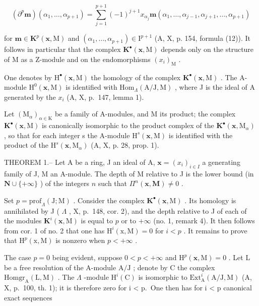 \[
\left(\partial^ {p} \boldsymbol {m}\right) \left(\alpha_ {1}, \dots , \alpha_ {p + 1}\right) = \sum_ {j = 1} ^ {p + 1} (- 1) ^ {j + 1} x _ {\alpha_ {j}} \boldsymbol {m} \left(\alpha_ {1}, \dots , \alpha_ {j - 1}, \alpha_ {j + 1}, \dots , \alpha_ {p + 1}\right)
\]

for \(\boldsymbol{m} \in \mathbf{K}^{p}(\mathbf{x}, \mathrm{M})\) and \((\alpha_{1}, \ldots, \alpha_{p+1}) \in \mathrm{I}^{p+1}\) (A, X, p. 154, formula (12)). It follows in particular that the complex \(\mathbf{K}^{\bullet}(\mathbf{x}, \mathrm{M})\) depends only on the structure of M as a Z-module and on the endomorphisms \((x_{i})_{\mathrm{M}}\) .

One denotes by \(\mathrm{H}^{\bullet}(\mathbf{x},\mathrm{M})\) the homology of the complex \(\mathbf{K}^{\bullet}(\mathbf{x},\mathrm{M})\) . The A-module \(\mathrm{H}^{0}(\mathbf{x},\mathrm{M})\) is identified with \(\mathrm{Hom}_{\Lambda}(\mathrm{A}/\mathrm{J},\mathrm{M})\) , where J is the ideal of A generated by the \(x_{i}\) (A, X, p.~147, lemma 1).

Let \((\mathrm{M}_{\alpha})_{\alpha\in\mathrm{K}}\) be a family of A-modules, and M its product; the complex \(\mathbf{K}^{\bullet}(\mathbf{x},\mathrm{M})\) is canonically isomorphic to the product complex of the \(\mathbf{K}^{\bullet}(\mathbf{x},\mathrm{M}_{\alpha})\) , so that for each integer s the A-module \(\mathrm{H}^{s}(\mathbf{x},\mathrm{M})\) is identified with the product of the \(\mathrm{H}^{s}(\mathbf{x},\mathrm{M}_{\alpha})\) (A, X, p. 28, prop. 1).

THEOREM 1.-- Let A be a ring, J an ideal of A, \(\mathbf{x} = (x_i)_{i \in I}\) a generating family of J, M an A-module. The depth of M relative to J is the lower bound (in \(\mathbf{N} \cup \{+\infty\}\) ) of the integers \(n\) such that \(\Pi^n(\mathbf{x}, \mathbf{M}) \neq 0\) .

Set \(p = \text{prof}_{\Lambda}(\text{J}; \text{M})\) . Consider the complex \(\mathbf{K}^{\bullet}(\mathbf{x}, \text{M})\) . Its homology is annihilated by J ( \(\Lambda\) , X, p.~148, cor. 2), and the depth relative to J of each of the modules \(\mathbf{K}^{i}(\mathbf{x}, \text{M})\) is equal to \(p\) or to \(+\infty\) (no. 1, remark 4). It then follows from cor. 1 of no. 2 that one has \(\text{H}^{i}(\text{x}, \text{M}) = 0\) for \(i < p\) . It remains to prove that \(\text{H}^{p}(\text{x}, \text{M})\) is nonzero when \(p < +\infty\) .

The case \(p = 0\) being evident, suppose \(0 < p < +\infty\) and \(\mathrm{H}^p(\mathbf{x},\mathrm{M}) = 0\) . Let L be a free resolution of the A-module \(\mathrm{A / J}\) ; denote by C the complex \(\mathrm{Homgr}_{\mathrm{A}}(\mathrm{L},\mathrm{M})\) . The \(\Lambda\) -module \(\mathrm{H}^i(\mathrm{C})\) is isomorphic to \(\mathrm{Ext}_{\mathrm{A}}^i(\mathrm{A / J},\mathrm{M})\) (A, X, p.~100, th. 1); it is therefore zero for i \textless{} p.~One then has for i \textless{} p canonical exact sequences


